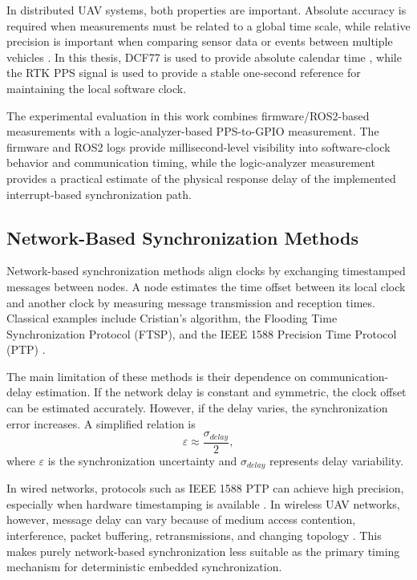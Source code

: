 In distributed UAV systems, both properties are important. Absolute accuracy is required when measurements must be related to a global time scale, while relative precision is important when comparing sensor data or events between multiple vehicles \cite{r1,r2,r7}. In this thesis, DCF77 is used to provide absolute calendar time \cite{ptbDcf77}, while the RTK PPS signal is used to provide a stable one-second reference for maintaining the local software clock.

The experimental evaluation in this work combines firmware/ROS2-based measurements with a logic-analyzer-based PPS-to-GPIO measurement. The firmware and ROS2 logs provide millisecond-level visibility into software-clock behavior and communication timing, while the logic-analyzer measurement provides a practical estimate of the physical response delay of the implemented interrupt-based synchronization path.

\subsection{Network-Based Synchronization Methods}

Network-based synchronization methods align clocks by exchanging timestamped messages between nodes. A node estimates the time offset between its local clock and another clock by measuring message transmission and reception times. Classical examples include Cristian's algorithm, the Flooding Time Synchronization Protocol (FTSP), and the IEEE 1588 Precision Time Protocol (PTP) \cite{cristian1989probabilistic,maroti2004ftsp,ieee1588}.

The main limitation of these methods is their dependence on communication-delay estimation. If the network delay is constant and symmetric, the clock offset can be estimated accurately. However, if the delay varies, the synchronization error increases. A simplified relation is
\begin{equation}
\varepsilon \approx \frac{\sigma_{delay}}{2},
\end{equation}
where $\varepsilon$ is the synchronization uncertainty and $\sigma_{delay}$ represents delay variability.

In wired networks, protocols such as IEEE 1588 PTP can achieve high precision, especially when hardware timestamping is available \cite{ieee1588}. In wireless UAV networks, however, message delay can vary because of medium access contention, interference, packet buffering, retransmissions, and changing topology \cite{lopez2021uavmesh}. This makes purely network-based synchronization less suitable as the primary timing mechanism for deterministic embedded synchronization.

